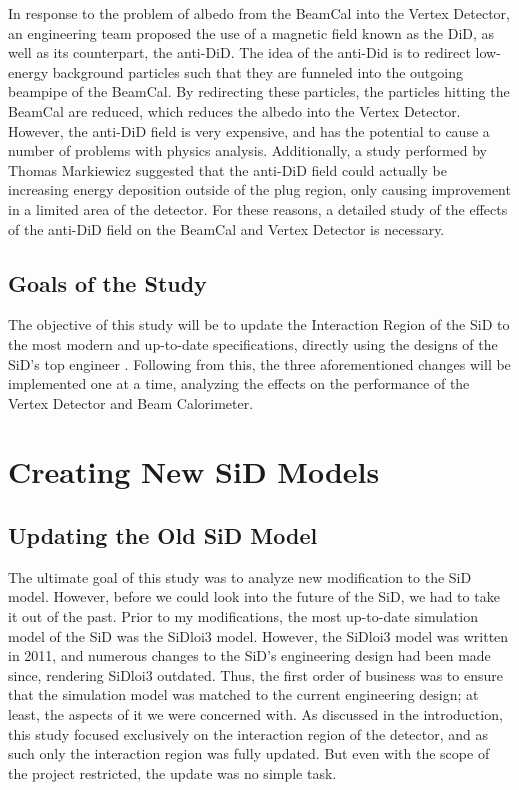 \documentclass{report}
\begin{document}
                In response to the problem of albedo from the BeamCal into the Vertex Detector, an engineering team proposed the use of a magnetic field known as the DiD, as well as its counterpart, the anti-DiD. The idea of the anti-Did is to redirect low-energy background particles such that they are funneled into the outgoing beampipe of the BeamCal. By redirecting these particles, the particles hitting the BeamCal are reduced, which reduces the albedo into the Vertex Detector. However, the anti-DiD field is very expensive, and has the potential to cause a number of problems with physics analysis. Additionally, a study performed by Thomas Markiewicz \cite{anti-did} suggested that the anti-DiD field could actually be increasing energy deposition outside of the plug region, only causing improvement in a limited area of the detector. For these reasons, a detailed study of the effects of the anti-DiD field on the BeamCal and Vertex Detector is necessary.


        \section{Goals of the Study}

            The objective of this study will be to update the Interaction Region of the SiD to the most modern and up-to-date specifications, directly using the designs of the SiD's top engineer \cite{excel}. Following from this, the three aforementioned changes will be implemented one at a time, analyzing the effects on the performance of the Vertex Detector and Beam Calorimeter. 





    \chapter{Creating New SiD Models}
        \section{Updating the Old SiD Model}
            
            The ultimate goal of this study was to analyze new modification to the SiD model. However, before we could look into the future of the SiD, we had to take it out of the past. Prior to my modifications, the most up-to-date simulation model of the SiD was the SiDloi3 model. However, the SiDloi3 model was written in 2011, and numerous changes to the SiD's engineering design had been made since, rendering SiDloi3 outdated. Thus, the first order of business was to ensure that the simulation model was matched to the current engineering design; at least, the aspects of it we were concerned with. As discussed in the introduction, this study focused exclusively on the interaction region of the detector, and as such only the interaction region was fully updated. But even with the scope of the project restricted, the update was no simple task.
\end{document}
